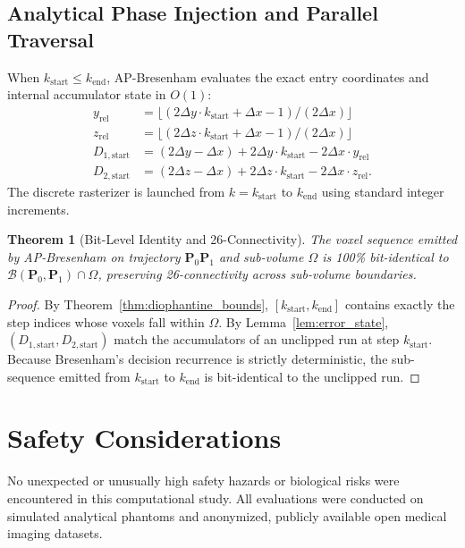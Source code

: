 \documentclass[journal=dme,manuscript=article,11pt]{article}
\newtheorem{theorem}{Theorem}
\begin{document}
\subsection{Analytical Phase Injection and Parallel Traversal}
When $k_{\mathrm{start}} \le k_{\mathrm{end}}$, AP-Bresenham evaluates the exact entry coordinates and internal accumulator state in $O(1)$:
\begin{align}
    y_{\mathrm{rel}} &= \lfloor (2\Delta y \cdot k_{\mathrm{start}} + \Delta x - 1) / (2\Delta x) \rfloor \\
    z_{\mathrm{rel}} &= \lfloor (2\Delta z \cdot k_{\mathrm{start}} + \Delta x - 1) / (2\Delta x) \rfloor \\
    D_{1,\mathrm{start}} &= (2\Delta y - \Delta x) + 2\Delta y \cdot k_{\mathrm{start}} - 2\Delta x \cdot y_{\mathrm{rel}} \\
    D_{2,\mathrm{start}} &= (2\Delta z - \Delta x) + 2\Delta z \cdot k_{\mathrm{start}} - 2\Delta x \cdot z_{\mathrm{rel}}.
\end{align}
The discrete rasterizer is launched from $k = k_{\mathrm{start}}$ to $k_{\mathrm{end}}$ using standard integer increments.

\begin{theorem}[Bit-Level Identity and 26-Connectivity]
\label{thm:bit_identity}
The voxel sequence emitted by AP-Bresenham on trajectory $\mathbf{P}_0\mathbf{P}_1$ and sub-volume $\Omega$ is 100\% bit-identical to $\mathcal{B}(\mathbf{P}_0, \mathbf{P}_1) \cap \Omega$, preserving 26-connectivity across sub-volume boundaries.
\end{theorem}

\begin{proof}
By Theorem~\ref{thm:diophantine_bounds}, $[k_{\mathrm{start}}, k_{\mathrm{end}}]$ contains exactly the step indices whose voxels fall within $\Omega$. By Lemma~\ref{lem:error_state}, $(D_{1,\mathrm{start}}, D_{2,\mathrm{start}})$ match the accumulators of an unclipped run at step $k_{\mathrm{start}}$. Because Bresenham's decision recurrence is strictly deterministic, the sub-sequence emitted from $k_{\mathrm{start}}$ to $k_{\mathrm{end}}$ is bit-identical to the unclipped run.
\end{proof}

\section{Safety Considerations}
No unexpected or unusually high safety hazards or biological risks were encountered in this computational study. All evaluations were conducted on simulated analytical phantoms and anonymized, publicly available open medical imaging datasets.
\end{document}
